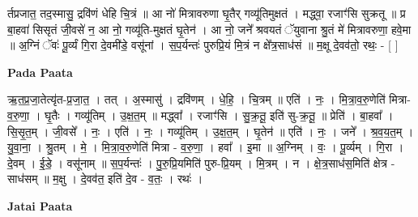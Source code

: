\documentclass[17pt]{extarticle}
\begin{document}
र्तप्रजात॒ तद॒स्मासु॒ द्रवि॑णं धेहि चि॒त्रं ॥ आ नो॑ मित्रावरुणा घृ॒तैर् गव्यू॑तिमुक्षतं । मद्ध्वा॒ रजाꣳ॑सि सुक्रतू ॥ प्र बा॒हवा॑ सिसृतं जी॒वसे॑ न॒ आ नो॒ गव्यू॑ति-मुक्षतं घृ॒तेन॑ । आ नो॒ जने᳚ श्रवयतं ॅयुवाना श्रु॒तं मे॑ मित्रावरुणा॒ हवे॒मा ॥ अ॒ग्निं ॅवः॑ पू॒र्व्यं गि॒रा दे॒वमी॑डे॒ वसू॑नां । स॒प॒र्यन्तः॑ पुरुप्रि॒यं मि॒त्रं न क्षे᳚त्र॒साध॑सं ॥ म॒क्षू दे॒वव॑तो॒ रथः॒ - [ ] \newline

\textbf{Pada Paata} \newline

ऋ॒त॒प्र॒जा॒तेत्यृ॑त-प्र॒जा॒त॒ । तत् । अ॒स्मासु॑ । द्रवि॑णम् । धे॒हि॒ । चि॒त्रम् ॥ एति॑ । नः॒ । मि॒त्रा॒व॒रु॒णेति॑ मित्रा-व॒रु॒णा॒ । घृ॒तैः । गव्यू॑तिम् । उ॒क्ष॒त॒म् ॥ मद्ध्वा᳚ । रजाꣳ॑सि । सु॒क्र॒तू॒ इति॑ सु-क्र॒तू॒ ॥ प्रेति॑ । बा॒हवा᳚ । सि॒सृ॒त॒म् । जी॒वसे᳚ । नः॒ । एति॑ । नः॒ । गव्यू॑तिम् । उ॒क्ष॒त॒म् । घृ॒तेन॑ ॥ एति॑ । नः॒ । जने᳚ । श्र॒व॒य॒त॒म् । यु॒वा॒ना॒ । श्रु॒तम् । मे॒ । मि॒त्रा॒व॒रु॒णेति॑ मित्रा - व॒रु॒णा॒ । हवा᳚ । इ॒मा ॥ अ॒ग्निम् । वः॒ । पू॒र्व्यम् । गि॒रा । दे॒वम् । ई॒डे॒ । वसू॑नाम् ॥ स॒प॒र्यन्तः॑ । पु॒रु॒प्रि॒यमिति॑ पुरु-प्रि॒यम् । मि॒त्रम् । न । क्षे॒त्र॒साध॑स॒मिति॑ क्षेत्र - साध॑सम् ॥ म॒क्षु । दे॒वव॑त॒ इति॑ दे॒व - व॒तः॒ । रथः॑ ।  \newline



\textbf{Jatai Paata} \newline
\end{document}
